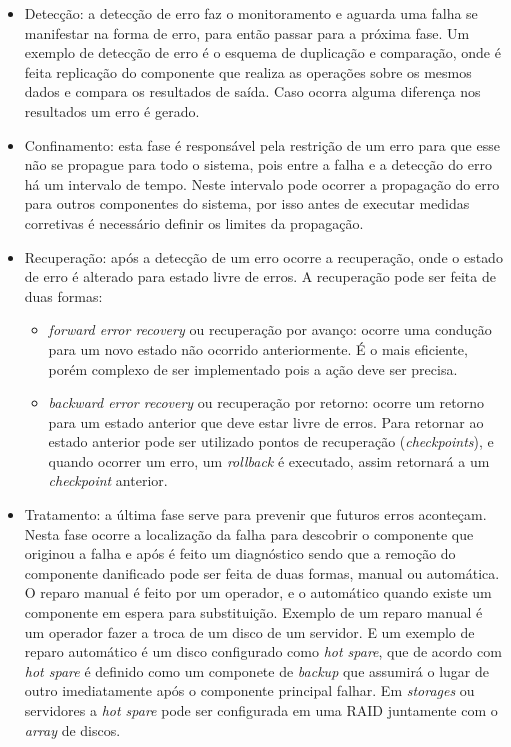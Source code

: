 
\begin{itemize}
 \item Detecção: a detecção de erro faz o monitoramento e aguarda uma falha se manifestar na forma de erro, para então
 passar para a próxima fase. Um exemplo de detecção de erro é o esquema de duplicação e comparação, onde é feita replicação do componente
 que realiza as operações sobre os mesmos dados e compara os resultados de saída. Caso ocorra alguma diferença nos resultados um erro é gerado.
 \item Confinamento: esta fase é responsável pela restrição de um erro para que esse não se propague para todo o sistema, pois entre a falha e a
 detecção do erro há um intervalo de tempo. Neste intervalo pode ocorrer a propagação do erro para outros componentes do sistema, por isso 
 antes de executar medidas corretivas é necessário definir os limites da propagação.
 \item Recuperação: após a detecção de um erro ocorre a recuperação, onde o estado de erro é alterado para estado livre de erros. A recuperação
 pode ser feita de duas formas:
 \begin{itemize}
  \item \textit{forward error recovery} ou recuperação por avanço: ocorre uma condução para um novo estado não ocorrido anteriormente. É o mais 
  eficiente, porém complexo de ser implementado pois a ação deve ser precisa.
  \item \textit{backward error recovery} ou recuperação por retorno: ocorre um retorno para um estado anterior que deve estar livre de erros.
  Para retornar ao estado anterior pode ser utilizado pontos de recuperação (\textit{checkpoints}), e quando ocorrer um erro, um \textit{rollback} 
  é executado, assim retornará a um \textit{checkpoint} anterior.
 \end{itemize}
 \item Tratamento: a última fase serve para prevenir que futuros erros aconteçam. Nesta fase ocorre a localização da falha para descobrir o 
 componente que originou a falha e após é feito um diagnóstico sendo que a remoção do componente danificado pode ser feita de duas formas, 
 manual ou automática. O reparo manual é feito por um operador, e o automático quando existe um componente em espera para substituição.
 Exemplo de um reparo manual é um operador fazer a troca de um disco de um servidor. E um exemplo de reparo automático é um disco configurado
 como \textit{hot spare}, que de acordo com \cite{rouse2013} \textit{hot spare} é definido como um componete de \textit{backup} que assumirá 
 o lugar de outro imediatamente após o componente principal falhar. Em \textit{storages} ou servidores a \textit{hot spare} pode ser configurada 
 em uma  \ac{RAID} juntamente com o \textit{array} de discos.
\end{itemize}

